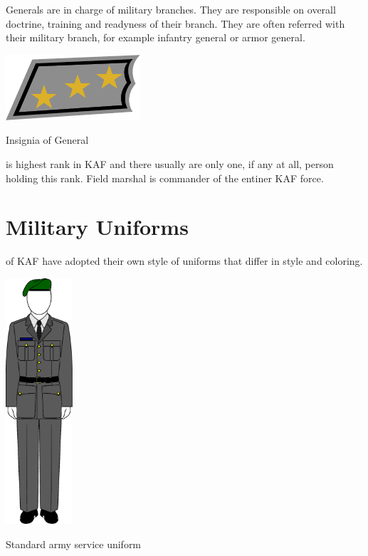 \documentclass{tufte-book}
\begin{document}

Generals are in charge of military branches. They are responsible on overall
doctrine, training and readyness of their branch. They are often referred with
their military branch, for example infantry general or armor general.

\begin{marginfigure}[0\baselineskip]
  \includegraphics[width=5.0cm]{rank-general}
  \caption{Insignia of General}
  \label{fig:insignia_general}
\end{marginfigure}

  is highest rank in KAF and there
usually are only one, if any at all, person holding this rank. Field marshal
is commander of the entiner KAF force.

\section{Military Uniforms}
\label{sc:military_uniforms}

 of KAF have adopted their own style of
uniforms that differ in style and coloring.

\begin{marginfigure}[0\baselineskip]
  \includegraphics[width=2.5cm]{army_service}
  \caption{Standard army service uniform}
  \label{fig:army_service}
\end{marginfigure}
\end{document}
